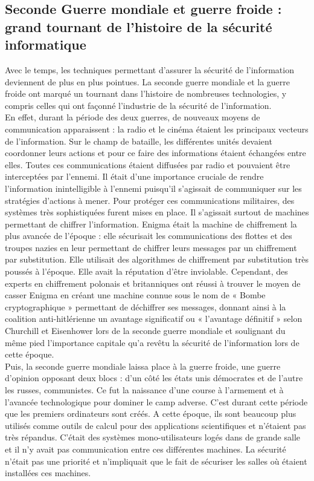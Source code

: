 \subsection{Seconde Guerre mondiale et guerre froide : grand tournant de l'histoire de la sécurité informatique}
Avec le temps, les techniques permettant d’assurer la sécurité de l’information deviennent de plus en plus pointues. La seconde guerre mondiale et la guerre froide ont marqué un tournant dans l’histoire de nombreuses technologies, y compris celles qui ont façonné l’industrie de la sécurité de l’information. \\
En effet, durant la période des deux guerres, de nouveaux moyens de communication apparaissent : la radio et le cinéma étaient les principaux vecteurs de l’information. Sur le champ de bataille, les différentes unités devaient coordonner leurs actions et pour ce faire des informations étaient échangées entre elles. Toutes ces communications étaient diffusées par radio et pouvaient être interceptées par l’ennemi. Il était d’une importance cruciale de rendre l’information inintelligible à l’ennemi puisqu’il s’agissait de communiquer sur les stratégies d’actions à mener. Pour protéger ces communications militaires, des systèmes très sophistiquées furent mises en place. Il s’agissait surtout de machines permettant de chiffrer l’information. Enigma était la machine de chiffrement la plus avancée de l’époque : elle sécurisait  les communications des flottes et des troupes nazies en leur permettant de chiffrer leurs messages par un chiffrement par substitution. Elle utilisait des algorithmes de chiffrement par substitution très poussés à l’époque. Elle avait la réputation d'être inviolable. Cependant, des experts en chiffrement polonais et britanniques ont réussi à trouver le moyen de casser Enigma en créant une machine connue sous le nom de « Bombe cryptographique » permettant de déchiffrer ses messages, donnant ainsi à la coalition anti-hitlérienne un avantage significatif  ou « l’avantage définitif » selon Churchill et Eisenhower  lors de la seconde guerre mondiale et soulignant du même pied l’importance capitale qu’a revêtu la sécurité de l’information lors de cette époque. \cite{checkmarx-history} \\ 
Puis, la seconde guerre mondiale laissa place à la guerre froide, une guerre d’opinion opposant deux blocs : d’un côté les états unis démocrates et de l’autre les russes, communistes. Ce fut la naissance d’une course à l’armement et à l’avancée technologique pour dominer le camp adverse. 
C’est durant cette période que les premiers ordinateurs sont créés. A cette époque, ils sont beaucoup plus utilisés comme outils de calcul pour des applications scientifiques et n’étaient pas très répandus. C’était des systèmes mono-utilisateurs logés dans de grande salle et il n’y avait pas communication entre ces différentes machines. La sécurité n’était pas une priorité et n’impliquait que le fait de sécuriser les salles où étaient installées ces machines. 
